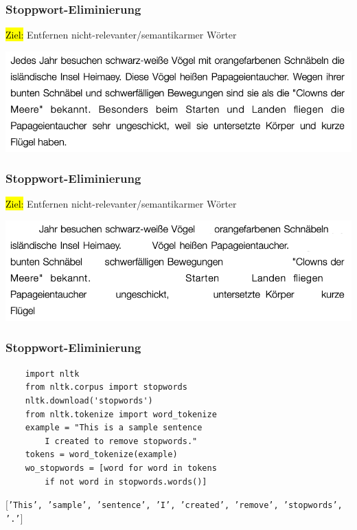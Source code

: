 \begin{frame}
    \frametitle{Stoppwort-Eliminierung}

    \hl{Ziel:} Entfernen nicht-relevanter/semantikarmer Wörter

    \centering\includegraphics[width=\textwidth]{fig8/stopwords_example1}

\end{frame}
     
\begin{frame}
    \frametitle{Stoppwort-Eliminierung}

    \hl{Ziel:} Entfernen nicht-relevanter/semantikarmer Wörter

    \centering\includegraphics[width=\textwidth]{fig8/stopwords_example2}

\end{frame}
     

\begin{frame}[fragile]
    \frametitle{Stoppwort-Eliminierung}

\begin{verbatim}
    import nltk
    from nltk.corpus import stopwords
    nltk.download('stopwords')
    from nltk.tokenize import word_tokenize
    example = "This is a sample sentence 
        I created to remove stopwords."
    tokens = word_tokenize(example)
    wo_stopwords = [word for word in tokens 
        if not word in stopwords.words()]
    \end{verbatim}

    \texttt{$[$'This', 'sample', 'sentence', 'I', 'created', 'remove', 'stopwords', '.'$]$}
    
\end{frame}

